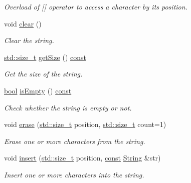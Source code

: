 \begin{DoxyCompactItemize}
\begin{DoxyCompactList}\small\item\em Overload of \mbox{[}\mbox{]} operator to access a character by its position. \end{DoxyCompactList}\item 
void \hyperlink{classsf_1_1_string_a391c1b4950cbf3d3f8040cea73af2969}{clear} ()
\begin{DoxyCompactList}\small\item\em Clear the string. \end{DoxyCompactList}\item 
\hyperlink{nc__alloc_8h_a7b60c5629e55e8ec87a4547dd4abced4}{std\-::size\-\_\-t} \hyperlink{classsf_1_1_string_a635d75c4cd830d5f639a41815dd0ce23}{get\-Size} () \hyperlink{term__entry_8h_a57bd63ce7f9a353488880e3de6692d5a}{const} 
\begin{DoxyCompactList}\small\item\em Get the size of the string. \end{DoxyCompactList}\item 
\hyperlink{term__entry_8h_a002004ba5d663f149f6c38064926abac}{bool} \hyperlink{classsf_1_1_string_a6c43f0cbe84cf17fa6ba93d58b75fcdc}{is\-Empty} () \hyperlink{term__entry_8h_a57bd63ce7f9a353488880e3de6692d5a}{const} 
\begin{DoxyCompactList}\small\item\em Check whether the string is empty or not. \end{DoxyCompactList}\item 
void \hyperlink{classsf_1_1_string_aaa78a0a46b3fbe200a4ccdedc326eb93}{erase} (\hyperlink{nc__alloc_8h_a7b60c5629e55e8ec87a4547dd4abced4}{std\-::size\-\_\-t} position, \hyperlink{nc__alloc_8h_a7b60c5629e55e8ec87a4547dd4abced4}{std\-::size\-\_\-t} count=1)
\begin{DoxyCompactList}\small\item\em Erase one or more characters from the string. \end{DoxyCompactList}\item 
void \hyperlink{classsf_1_1_string_ad0b1455deabf07af13ee79812e05fa02}{insert} (\hyperlink{nc__alloc_8h_a7b60c5629e55e8ec87a4547dd4abced4}{std\-::size\-\_\-t} position, \hyperlink{term__entry_8h_a57bd63ce7f9a353488880e3de6692d5a}{const} \hyperlink{classsf_1_1_string}{String} \&str)
\begin{DoxyCompactList}\small\item\em Insert one or more characters into the string. \end{DoxyCompactList}\item 

\end{DoxyCompactItemize}
